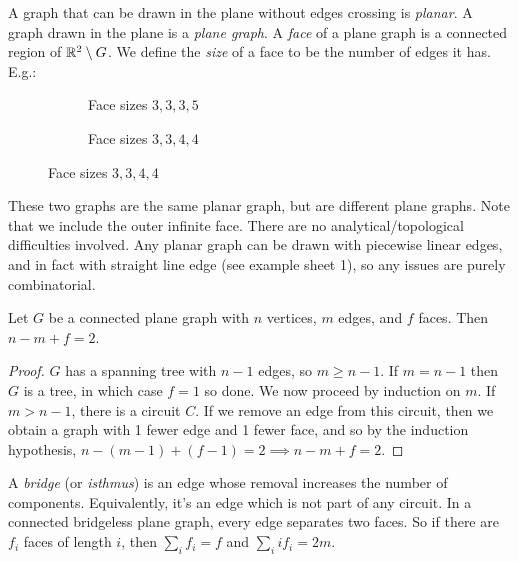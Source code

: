 \documentclass[10pt,a4paper]{article}
\begin{document}
A graph that can be drawn in the plane without edges crossing is \emph{planar}. A graph drawn in the plane is a \emph{plane graph}. A \emph{face} of a plane graph is a connected region of $\mathbb{R}^2\setminus G$. We define the \emph{size} of a face to be the number of edges it has.\\
E.g.:
\begin{figure}[h]
\begin{subfigure}{.5\textwidth}
\centering
{}
\caption{Face sizes $3,3,3,5$}
\end{subfigure}
\begin{subfigure}{.5\textwidth}
\centering
{}
\caption{Face sizes $3,3,4,4$}
\end{subfigure}
\end{figure}

These two graphs are the same planar graph, but are different plane graphs. Note that we include the outer infinite face. There are no analytical/topological difficulties involved. Any planar graph can be drawn with piecewise linear edges, and in fact with straight line edge (see example sheet 1), so any issues are purely combinatorial.

\begin{theorem}[Euler]
Let $G$ be a connected plane graph with $n$ vertices, $m$ edges, and $f$ faces. Then $n-m+f = 2$.
\end{theorem}
\begin{proof}
$G$ has a spanning tree with $n-1$ edges, so $m\geq n-1$. If $m=n-1$ then $G$ is a tree, in which case $f=1$ so done. We now proceed by induction on $m$. If $m>n-1$, there is a circuit $C$. If we remove an edge from this circuit, then we obtain a graph with 1 fewer edge and 1 fewer face, and so by the induction hypothesis, $n-(m-1)+(f-1)=2 \implies n-m+f=2$.
\end{proof}

A \emph{bridge} (or \emph{isthmus}) is an edge whose removal increases the number of components. Equivalently, it's an edge which is not part of any circuit. In a connected bridgeless plane graph, every edge separates two faces. So if there are $f_i$ faces of length $i$, then $\sum_i f_i = f$ and $\sum_i if_i = 2m$.
\end{document}
